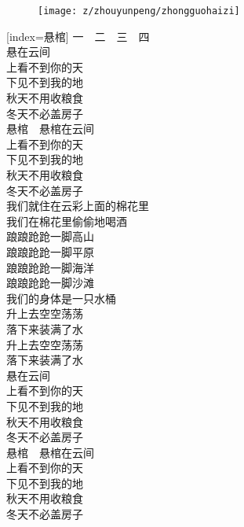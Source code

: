 \begin{figure}[htp]
	\begin{center}
	  \texttt{[image: z/zhouyunpeng/zhongguohaizi]}
	  \label{fig:zhongguohaizi}
	\end{center}
\end{figure}

\begin{songs}{}
  [index={悬棺}]
	一　二　三　四	\\
	悬在云间	\\
	上看不到你的天	\\
	下见不到我的地	\\
	秋天不用收粮食	\\
	冬天不必盖房子	\\
	\vspace{2ex}
	悬棺　悬棺在云间	\\
	上看不到你的天	\\
	下见不到我的地	\\
	秋天不用收粮食	\\
	冬天不必盖房子	\\
	\vspace{2ex}
	我们就住在云彩上面的棉花里	\\
	我们在棉花里偷偷地喝酒	\\
	踉踉跄跄一脚高山	\\
	踉踉跄跄一脚平原	\\
	踉踉跄跄一脚海洋	\\
	踉踉跄跄一脚沙滩	\\
	我们的身体是一只水桶	\\
	升上去空空荡荡	\\
	落下来装满了水	\\
	升上去空空荡荡	\\
	落下来装满了水	\\
	\vspace{2ex}
	悬在云间	\\
	上看不到你的天	\\
	下见不到我的地	\\
	秋天不用收粮食	\\
	冬天不必盖房子	\\
	\vspace{2ex}
	悬棺　悬棺在云间	\\
	上看不到你的天	\\
	下见不到我的地	\\
	秋天不用收粮食	\\
	冬天不必盖房子	\\
  \endsong
\end{songs}
